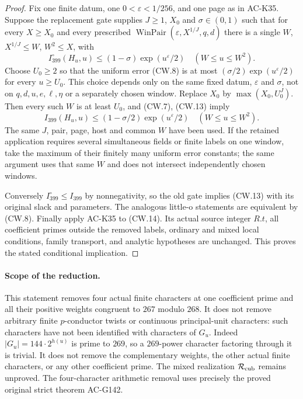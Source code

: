 \begin{proof}
Fix one finite datum, one $0<\varepsilon<1/256$, and one page as
in AC-K35.  Suppose the replacement gate supplies
$J\geq1$, $X_0$ and $\sigma\in(0,1)$ such that for every
$X\geq X_0$ and every prescribed
$\operatorname{WinPair}(\varepsilon,X^{1/J},q,d)$ there is a single
$W$, $X^{1/J}\leq W$, $W^2\leq X$, with
\[
 I_{399}^{\circ}(H_u,u)\leq(1-\sigma)\exp(u^\varepsilon/2)
                       \quad(W\leq u\leq W^2).
 \tag{CW.13}
\]
Choose $U_0\geq2$ so that the uniform error (CW.8) is at most
$(\sigma/2)\exp(u^\varepsilon/2)$ for every $u\geq U_0$.
This choice depends only on the same fixed datum, $\varepsilon$
and $\sigma$, not on $q,d,u,e,\ell,\eta$ or a separately chosen
window.  Replace $X_0$ by $\max(X_0,U_0^J)$.  Then every such
$W$ is at least $U_0$, and (CW.7), (CW.13) imply
\[
 I_{399}(H_u,u)\leq(1-\sigma/2)\exp(u^\varepsilon/2)
                       \quad(W\leq u\leq W^2).
 \tag{CW.14}
\]
The same $J$, pair, page, host and common $W$ have been used.
If the retained application requires several simultaneous fields
or finite labels on one window, take the maximum of their finitely
many uniform error constants; the same argument uses that same
$W$ and does not intersect independently chosen windows.

Conversely $I_{399}^{\circ}\leq I_{399}$ by nonnegativity, so the
old gate implies (CW.13) with its original slack and parameters.
The analogous little-o statements are equivalent by (CW.8).
Finally apply AC-K35 to (CW.14).  Its actual source integer $R.t$,
all coefficient primes outside the removed labels, ordinary and
mixed local conditions, family transport, and analytic hypotheses
are unchanged.  This proves the stated conditional implication.
\end{proof}

\paragraph{Scope of the reduction.}
This statement removes four actual finite characters at one coefficient
prime and all their positive weights congruent to $267$ modulo $268$.
It does not remove arbitrary finite $p$-conductor twists or continuous
principal-unit characters: such characters have not been identified
with characters of $G_u$.  Indeed $|G_u|=144\cdot2^{h(u)}$ is prime
to $269$, so a $269$-power character factoring through it is trivial.
It does not remove the complementary weights, the other actual finite
characters, or any other coefficient prime.  The mixed realization
$\mathcal R_{\rm cub}$ remains unproved.  The four-character arithmetic
removal uses precisely the proved original strict theorem AC-G142.

